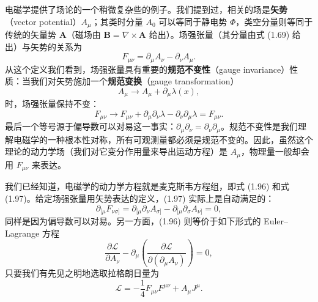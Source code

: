 电磁学提供了场论的一个稍微复杂些的例子。我们提到过，相关的场是\textbf{矢势}（vector potential）$A_{\mu}$；其类时分量 $A_{0}$ 可以等同于静电势 $\Phi$，类空分量则等同于传统的矢量势 $\mathbf{A}$（磁场由 $\mathbf{B}=\nabla\times\mathbf{A}$ 给出）。场强张量（其分量由式 (1.69) 给出）与矢势的关系为
\begin{equation*}
F_{\mu\nu} = \partial_{\mu}A_{\nu} - \partial_{\nu}A_{\mu}.
\tag{1.157}
\end{equation*}
从这个定义我们看到，场强张量具有重要的\textbf{规范不变性}（gauge invariance）性质：当我们对矢势施加一个\textbf{规范变换}（gauge transformation）
\begin{equation*}
A_{\mu} \rightarrow A_{\mu} + \partial_{\mu}\lambda(x),
\tag{1.158}
\end{equation*}
时，场强张量保持不变：
\begin{equation*}
F_{\mu\nu} \rightarrow F_{\mu\nu} + \partial_{\mu}\partial_{\nu}\lambda - \partial_{\nu}\partial_{\mu}\lambda = F_{\mu\nu}.
\tag{1.159}
\end{equation*}
最后一个等号源于偏导数可以对易这一事实：$\partial_{\mu}\partial_{\nu}=\partial_{\nu}\partial_{\mu}$。规范不变性是我们理解电磁学的一种根本性对称，所有可观测量都必须是规范不变的。因此，虽然这个理论的动力学场（我们对它变分作用量来导出运动方程）是 $A_{\mu}$，物理量一般却会用 $F_{\mu\nu}$ 来表达。

我们已经知道，电磁学的动力学方程就是麦克斯韦方程组，即式 (1.96) 和式 (1.97)。给定场强张量用矢势表达的定义，(1.97) 实际上是自动满足的：
\begin{equation*}
\partial_{[\mu}F_{\nu\sigma]} = \partial_{[\mu}\partial_{\nu}A_{\sigma]} - \partial_{[\mu}\partial_{\sigma}A_{\nu]} = 0,
\tag{1.160}
\end{equation*}
同样是因为偏导数可以对易。另一方面，(1.96) 则等价于如下形式的 Euler--Lagrange 方程
\begin{equation*}
\frac{\partial\mathcal{L}}{\partial A_{\nu}} - \partial_{\mu}\left(\frac{\partial\mathcal{L}}{\partial(\partial_{\mu}A_{\nu})}\right) = 0,
\tag{1.161}
\end{equation*}
只要我们有先见之明地选取拉格朗日量为
\begin{equation*}
\mathcal{L} = -\frac{1}{4}F_{\mu\nu}F^{\mu\nu} + A_{\mu}J^{\mu}.
\tag{1.162}
\end{equation*}


